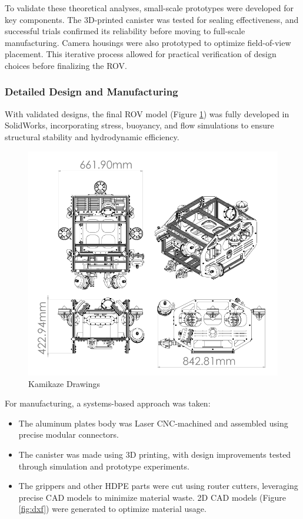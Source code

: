 \hspace{10pt} To validate these theoretical analyses, small-scale prototypes were developed for key components. The 3D-printed canister was tested for sealing effectiveness, and successful trials confirmed its reliability before moving to full-scale manufacturing. Camera housings were also prototyped to optimize field-of-view placement. This iterative process allowed for practical verification of design choices before finalizing the ROV.

\subsubsection{Detailed Design and Manufacturing}

With validated designs, the final ROV model (Figure \ref{fig:kamikaze_drawings}) was fully developed in SolidWorks, incorporating stress, buoyancy, and flow simulations to ensure structural stability and hydrodynamic efficiency.

\begin{figure}[h]
    \centering
    \includegraphics[width=0.8\columnwidth]{Sections/2Design Rationale/images/Drawings.png}
    \caption{Kamikaze Drawings}
    \label{fig:kamikaze_drawings}
\end{figure}

For manufacturing, a systems-based approach was taken:

\vspace{-0.5\baselineskip}
\begin{itemize}
    \setlength{\itemsep}{0pt}
    \item The aluminum plates body was Laser CNC-machined and assembled using precise modular connectors.
    \item The canister was made using 3D printing, with design improvements tested through simulation and prototype experiments.
    \item The grippers and other HDPE parts were cut using router cutters, leveraging precise CAD models to minimize material waste. 2D CAD models (Figure \ref{fig:dxf}) were generated to optimize material usage.
\end{itemize}

